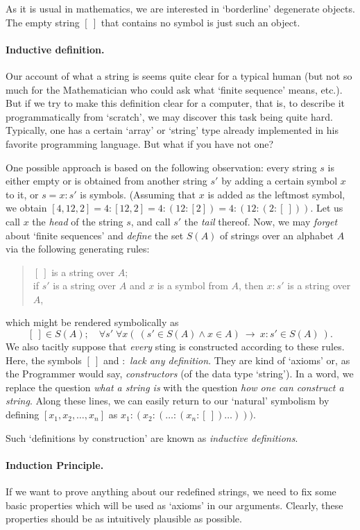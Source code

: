 \documentclass[12pt,notitlepage]{article}
\theoremstyle{plain}
\theoremstyle{definition}
\theoremstyle{plain}
\newcommand{\1}{\mathbf{1}}
\newcommand{\0}{\mathbf{0}}
\begin{document}
As it is usual in mathematics, we are interested in `borderline' degenerate objects. The empty string $[\ ]$ that contains no symbol is just such an object.

\paragraph{Inductive definition.} Our account of what a string is seems quite clear for a typical human (but not so much for the Mathematician who could ask what `finite sequence' means, etc.). But if we try to make this definition clear for a computer, that is, to describe it programmatically from `scratch', we may discover this task being quite hard. Typically, one has a certain `array' or `string' type already implemented in his favorite programming language. But what if you have not one?

One possible approach is based on the following observation: every string $s$ is either empty or is obtained from another string $s'$ by adding a certain symbol $x$ to it, or $s = x : s'$ is symbols. (Assuming that $x$ is added as the leftmost symbol, we obtain $[4,12, 2] = 4 : [12, 2] = 4 : (12 : [2]) = 4 : (12 : (2 : [\ ]))$. Let us call $x$ the \emph{head} of the string $s$, and call $s'$ the \emph{tail} thereof. Now, we may \emph{forget} about `finite sequences' and \emph{define} the set $S(A)$ of strings over an alphabet $A$ via the following generating rules:
\begin{quote}
	$[\ ]$ is a string over $A$;\\
	if $s'$ is a string over $A$ and $x$ is a symbol from $A$, then $x : s'$ is a string over $A$,
\end{quote}
which might be rendered symbolically as
$$[\ ] \in S(A);\quad \forall s'\; \forall x \left(\ (s' \in  S(A) \wedge  x \in A)\ \to\ x : s' \in S(A)\  \right).$$
We also tacitly suppose that \emph{every} sting is constructed according to these rules. Here, the symbols $[\ ]$ and $:$ \emph{lack any definition}. They are kind of `axioms' or, as the Programmer would say, \emph{constructors} (of the data type `string'). In a word, we replace the question \emph{what a string is} with the question \emph{how one can construct a string}. Along these lines, we can easily return to our `natural' symbolism by defining $[x_1, x_2, \ldots, x_n]$ as $x_1 : (x_2 : (\ldots : (x_n : [\ ])\ldots)))$.

Such `definitions by construction' are known as \emph{inductive definitions}.

\paragraph{Induction Principle.} If we want to prove anything about our redefined strings, we need to fix some basic properties which will be used as `axioms' in our arguments. Clearly, these properties should be as intuitively plausible as possible.
\end{document}
